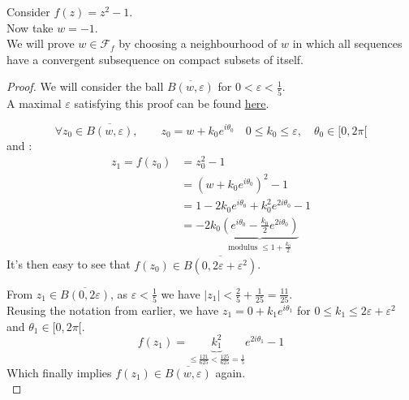 \documentclass{article}
\begin{document}
Consider $f(z) = z^2-1$. \\
\vspace{2mm}
Now take $w = -1$. \\
\vspace{2mm}
We will prove $w \in \mathcal{F}_f$ by choosing a neighbourhood of $w$ in which all sequences have a convergent subsequence on compact subsets of itself. \\
\vspace{5mm}

\begin{proof}

We will consider the ball $\overline{B(w,\varepsilon)}$ for $0 < \varepsilon < \frac{1}{5}$. \\
A maximal $\varepsilon$ satisfying this proof can be found \textcolor{blue}{\underline{\href{https://www.wolframalpha.com/input?i=positive+solution+of+\%CE\%B5+\%3D+\%282\%CE\%B5\%2B\%CE\%B5\%5E2\%29\%5E2}{here}}}. \\
\vspace{5mm}

$$\forall z_0 \in \overline{B(w,\varepsilon)}, \qquad z_0 = w+k_0e^{i \theta_0} \quad 0 \leq k_0 \leq \varepsilon, \quad \theta_0 \in [0, 2 \pi[$$
and : \\
\vspace{-3mm}
\begin{align*}
z_1 = f(z_0) &= z_0^2-1 \\
&= (w+k_0 e^{i \theta_0})^2-1 \\
&= 1 - 2k_0e^{i \theta_0} + k_0^2 e^{2i \theta_0}-1 \\
&= -2k_0 \underbrace{\left( e^{i \theta_0}- \frac{k_0}{2} e^{2i \theta_0} \right)}_{\text{modulus } \leq 1+ \frac{k_0}{2} }
\end{align*}
\vspace{-2mm}
It's then easy to see that $f(z_0) \in \overline{B(0,2 \varepsilon + \varepsilon^2)}$. \\
\vspace{5mm}

From $z_1 \in \overline{B(0, 2\varepsilon)}$, as $\varepsilon < \frac{1}{5}$ we have $\lvert z_1 \rvert < \frac{2}{5} + \frac{1}{25} = \frac{11}{25}$. \\
Reusing the notation from earlier, we have $z_1 = 0 + k_1 e^{i \theta_1}$ for $0 \leq k_1 \leq 2\varepsilon + \varepsilon^2$ and $\theta_1 \in [0,2 \pi[$. \\
$$f(z_1) = \underbrace{k_1^2}_{\leq \frac{121}{625} < \frac{125}{625} = \frac{1}{5}}e^{2i \theta_1}-1$$
Which finally implies $f(z_1) \in \overline{B(w,\varepsilon)}$ again. \\
\vspace{5mm}


\end{proof}
\end{document}
